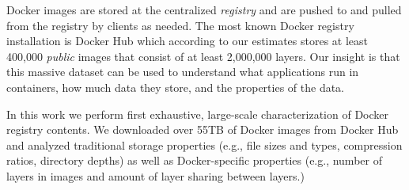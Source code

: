 Docker images are stored at the centralized \emph{registry} and are pushed to
and pulled from the registry by clients as needed. 
%
The most known Docker registry installation is Docker Hub which according to
our estimates stores at least 400,000 \emph{public} images that consist of at
least 2,000,000 layers.
%
Our insight is that this massive dataset can be used to understand what
applications run in containers, how much data they store, and the properties of
the data.




In this work we perform first exhaustive, large-scale characterization of
Docker registry contents.
%
We downloaded over 55TB of Docker images from Docker Hub and analyzed
traditional storage properties (e.g., file sizes and types, compression ratios,
directory depths) as well as Docker-specific properties (e.g., number of layers
in images and amount of layer sharing between layers.)
%

%

